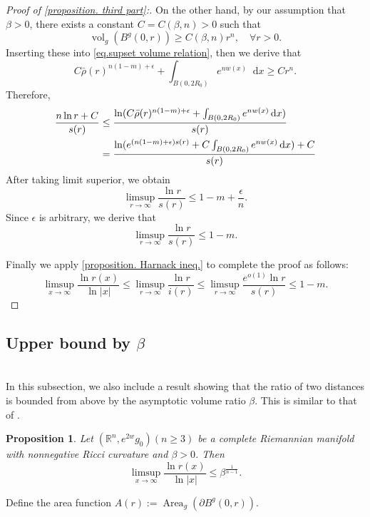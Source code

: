 \documentclass[12pt]{amsart}
\theoremstyle{plain}
\newtheorem{proposition}[theorem]{Proposition}
\theoremstyle{definition}
\theoremstyle{remark}     %
\numberwithin{equation}{section}
\newcommand{\dx}{\mathop{}\!\mathrm{d}x}
\begin{document}
\begin{proof}[Proof of \cref{proposition. third part}:]
    On the other hand, by our assumption that $\beta>0$, there exists a constant $C=C(\beta,n)>0$ such that
    \[
        \operatorname{vol}_g(B^g(0,r))\geq C(\beta,n)r^n,\quad \forall r>0.
    \]
    Inserting these into \cref{eq.supset volume relation}, then we derive that
    \[
        C\bar{\rho}(r)^{n(1-m)+\epsilon}
        +\int_{B(0,2R_0)}
        e^{nw(x)}\dx
        \geq C r^n.
    \]
    Therefore,
    \begin{align*}
        \frac{n\ln r+C}{s(r)}&\leq \frac{\ln(C\bar{\rho}(r)^{n(1-m)+\epsilon}+\int_{B(0,2R_0)}
        e^{nw(x)}\dx)}{s(r)} \\ \notag
        &=\frac{\ln (e^{(n(1-m)+\epsilon)s(r) }+C\int_{B(0,2R_0)}
        e^{nw(x)}\dx)+C}{s(r)}
    \end{align*}
    After taking limit superior, we obtain
    \[
        \limsup_{r\to \infty}\frac{\ln r}{s(r)}
        \leq 1-m+\frac{\epsilon}{n}.
    \]
    Since $\epsilon$ is arbitrary, we derive that
    \[
        \limsup_{r\to \infty}\frac{\ln r}{s(r)}
        \leq 1-m.
    \]

    Finally we apply \cref{proposition. Harnack ineq.} to complete the proof as follows:
    \[
        \limsup_{x\to\infty}\frac{\ln r(x)}{\ln |x|}\leq 
        \limsup_{r\to \infty}\frac{\ln r}{i(r)}
        \leq \limsup_{r\to \infty}\frac{e^{o(1)}\ln r}{s(r)}
        \leq 1-m.
    \]
\end{proof}

\subsection{Upper bound by $\beta$ }
\ \\
In this subsection, we also include a result showing that the ratio of two distances is bounded from above by the asymptotic volume ratio $\beta$. This is similar to that of \cite[Theorem 2.5]{LT2}.

\begin{proposition}\label{proposition. first part}
    Let $(\mathbb{R}^n,e^{2w}g_0) (n\geq 3)$ be a complete Riemannian manifold with nonnegative Ricci curvature and  $\beta>0$.
    Then 
    \[
        \limsup_{x\to \infty}\frac{\ln r(x)}{\ln |x|}\leq \beta^{\frac{1}{n-1}}.
    \]
\end{proposition}

 Define the area function  
$A(r):=\operatorname{Area}_g(\partial B^g(0,r)).$
\end{document}
